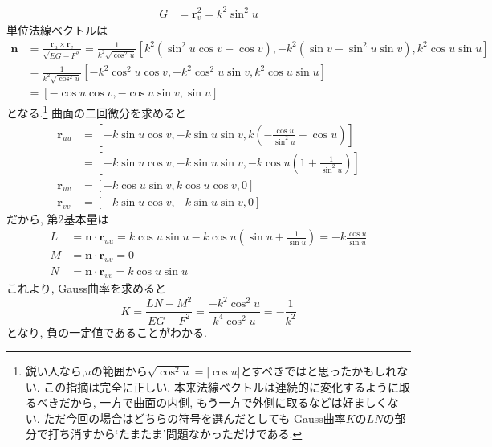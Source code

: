 \documentclass[a4j,dvipdfmx]{jsarticle}
\begin{document}
\begin{qparts}
\begin{align*}
                G&=\bm{r}_v^2=k^2\sin^2 u
            \end{align*}
            単位法線ベクトルは
            \begin{align*}
                \bm{n}&=\frac{\bm{r}_u\times\bm{r}_v}{\sqrt{EG-F^2}}=\frac{1}{k^2\sqrt{\cos^2u}}[k^2(\sin^2u\cos v-\cos v),-k^2(\sin v-\sin^2 u\sin v),k^2\cos u\sin u]\\
                      &=\frac{1}{k^2\sqrt{\cos^2u}}[-k^2\cos^2u\cos v,-k^2\cos^2u\sin v,k^2\cos u\sin u]\\
                      &=[-\cos u\cos v,-\cos u\sin v,\sin u]
            \end{align*}
            となる.\footnote{鋭い人なら,$u$の範囲から$\sqrt{\cos^2 u}=|\cos u|$とすべきではと思ったかもしれない. この指摘は完全に正しい. 本来法線ベクトルは連続的に変化するように取るべきだから, 一方で曲面の内側, もう一方で外側に取るなどは好ましくない. ただ今回の場合はどちらの符号を選んだとしても
            Gauss曲率$K$の$LN$の部分で打ち消すから`たまたま'問題なかっただけである.}
            曲面の二回微分を求めると
            \begin{align*}
                \bm{r}_{uu}&=\left[-k\sin u\cos v,-k\sin u\sin v,k\left(-\frac{\cos u}{\sin^2 u}-\cos u\right)\right]\\
                           &=\left[-k\sin u\cos v,-k\sin u\sin v,-k\cos u\left(1+\frac{1}{\sin^2 u}\right)\right]\\
                \bm{r}_{uv}&=\left[-k\cos u\sin v,k\cos u\cos v,0\right]\\
                \bm{r}_{vv}&=\left[-k\sin u\cos v,-k\sin u\sin v,0\right]
            \end{align*}
            だから, 第2基本量は
            \begin{align*}
                L&=\bm{n}\cdot\bm{r}_{uu}=k\cos u\sin u-k\cos u\left(\sin u+\frac{1}{\sin u}\right)=-k\frac{\cos u}{\sin u}\\
                M&=\bm{n}\cdot \bm{r}_{uv} = 0\\
                N&=\bm{n}\cdot\bm{r}_{vv}=k\cos u\sin u
            \end{align*}
            これより, Gauss曲率を求めると
            \begin{equation*}
                K=\frac{LN-M^2}{EG-F^2}=\frac{-k^2\cos^2u}{k^4\cos^2u}=-\frac{1}{k^2}
            \end{equation*}
            となり, 負の一定値であることがわかる.
        \end{qparts}
    \clearpage
\end{document}

